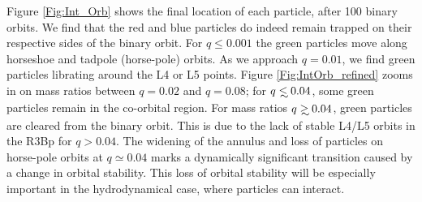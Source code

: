 \documentclass[usenatbib]{mnras}
\newcommand\lsim{\mathrel{\rlap{\lower4pt\hbox{\hskip1pt$\sim$}}
        \raise1pt\hbox{$<$}}}
\newcommand\gsim{\mathrel{\rlap{\lower4pt\hbox{\hskip1pt$\sim$}}
        \raise1pt\hbox{$>$}}}
\begin{document}
Figure \ref{Fig:Int_Orb} shows the final location of each particle,
after 100 binary orbits. We find that the red and blue particles do
indeed remain trapped on their respective sides of the binary
orbit. For $q\leq 0.001$ the green particles move along horseshoe and
tadpole (horse-pole) orbits. As we approach $q=0.01$, we find green
particles librating around the L4 or L5 points. Figure
\ref{Fig:IntOrb_refined} zooms in on mass ratios between $q=0.02$ and
$q=0.08$; for $q\lsim 0.04$, some green particles remain in the
co-orbital region. For mass ratios $q \gsim 0.04$, green particles are
cleared from the binary orbit. This is due to the lack of stable L4/L5
orbits in the R3Bp for $q>0.04$. The widening of the annulus and loss
of particles on horse-pole orbits at $q \simeq 0.04$ marks a
dynamically significant transition caused by a change in orbital
stability. This loss of orbital stability will be especially important
in the hydrodynamical case, where particles can interact.
\end{document}
